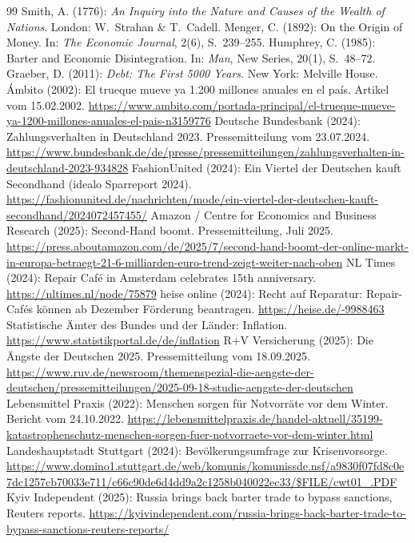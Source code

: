 \documentclass[11pt, a4paper]{article}
\begin{document}
\begin{thebibliography}{99}
\small
{} Smith, A. (1776): \emph{An Inquiry into the Nature and
    Causes of the Wealth of Nations}. London: W.~Strahan \& T.~Cadell.
 Menger, C. (1892): On the Origin of Money. In:
    \emph{The Economic Journal}, 2(6), S.~239--255.
 Humphrey, C. (1985): Barter and Economic
    Disintegration. In: \emph{Man}, New Series, 20(1), S.~48--72.
 Graeber, D. (2011): \emph{Debt: The First 5000 Years}.
    New York: Melville House.
 Ámbito (2002): El trueque mueve ya 1.200 millones
    anuales en el país. Artikel vom 15.02.2002.
    \url{https://www.ambito.com/portada-principal/el-trueque-mueve-ya-1200-millones-anuales-el-pais-n3159776}
 Deutsche Bundesbank (2024): Zahlungsverhalten in
    Deutschland 2023. Pressemitteilung vom 23.07.2024.
    \url{https://www.bundesbank.de/de/presse/pressemitteilungen/zahlungsverhalten-in-deutschland-2023-934828}
 FashionUnited (2024): Ein Viertel der Deutschen kauft
    Secondhand (idealo Sparreport 2024).
    \url{https://fashionunited.de/nachrichten/mode/ein-viertel-der-deutschen-kauft-secondhand/2024072457455/}
 Amazon / Centre for Economics and Business Research (2025):
    Second-Hand boomt. Pressemitteilung, Juli 2025.
    \url{https://press.aboutamazon.com/de/2025/7/second-hand-boomt-der-online-markt-in-europa-betraegt-21-6-milliarden-euro-trend-zeigt-weiter-nach-oben}
 NL Times (2024): Repair Café in Amsterdam celebrates
    15th anniversary. \url{https://nltimes.nl/node/75879}
 heise online (2024): Recht auf Reparatur: Repair-Cafés
    können ab Dezember Förderung beantragen. \url{https://heise.de/-9988463}
 Statistische Ämter des Bundes und der Länder:
    Inflation. \url{https://www.statistikportal.de/de/inflation}
 R+V Versicherung (2025): Die Ängste der Deutschen 2025.
    Pressemitteilung vom 18.09.2025.
    \url{https://www.ruv.de/newsroom/themenspezial-die-aengste-der-deutschen/pressemitteilungen/2025-09-18-studie-aengste-der-deutschen}
 Lebensmittel Praxis (2022): Menschen sorgen für
    Notvorräte vor dem Winter. Bericht vom 24.10.2022.
    \url{https://lebensmittelpraxis.de/handel-aktuell/35199-katastrophenschutz-menschen-sorgen-fuer-notvorraete-vor-dem-winter.html}
 Landeshauptstadt Stuttgart (2024): Bevölkerungsumfrage
    zur Krisenvorsorge.
    \url{https://www.domino1.stuttgart.de/web/komunis/komunissde.nsf/a9830f07fd8c0e7dc1257cb70033e711/c66c90de6d4dd9a2c1258b040022ec33/$FILE/cwt01_.PDF}
 Kyiv Independent (2025): Russia brings back barter trade
    to bypass sanctions, Reuters reports.
    \url{https://kyivindependent.com/russia-brings-back-barter-trade-to-bypass-sanctions-reuters-reports/}
\end{thebibliography}

\end{document}
